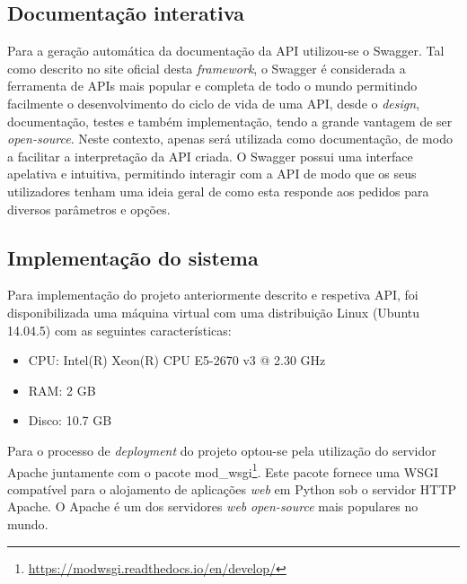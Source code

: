 \subsection{Documentação interativa}


Para a geração automática da documentação da \ac{API} utilizou-se o Swagger. Tal como descrito no site oficial desta \textit{framework}\cite{SmartBearSoftware2017}, o Swagger é considerada a ferramenta de APIs mais popular e completa de todo o mundo permitindo facilmente o desenvolvimento do ciclo de vida de uma \ac{API}, desde o \textit{design}, documentação, testes e também implementação, tendo a grande vantagem de ser \textit{open-source}. Neste contexto, apenas será utilizada como documentação, de modo a facilitar a interpretação da \ac{API} criada. O Swagger possui uma interface apelativa e intuitiva, permitindo interagir com a \ac{API} de modo que os seus utilizadores tenham uma ideia geral de como esta responde aos pedidos para diversos parâmetros e opções. 

\subsection{Implementação do sistema}

Para implementação do projeto anteriormente descrito e respetiva API, foi disponibilizada uma máquina virtual com uma distribuição Linux (Ubuntu 14.04.5) com as seguintes características: 

\begin{itemize}
	\item \ac{CPU}: Intel(R) Xeon(R) CPU E5-2670 v3 @ 2.30 GHz
	\item \ac{RAM}: 2 GB
	\item Disco: 10.7 GB
\end{itemize}


Para o processo de \textit{deployment} do projeto optou-se pela utilização do servidor Apache juntamente com o pacote mod\_wsgi\footnote{\url{https://modwsgi.readthedocs.io/en/develop/}}. 
Este pacote fornece uma \ac{WSGI} compatível para o alojamento de aplicações \textit{web} em Python sob o servidor \ac{HTTP} Apache. O Apache é um dos servidores \textit{web} \textit{open-source} mais  populares no mundo\cite{TheApacheSoftwareFoundation2016}.



